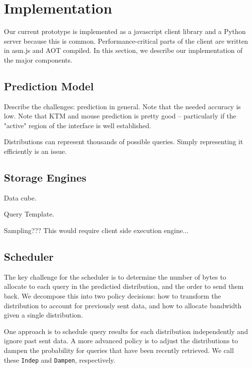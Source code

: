 \section{Implementation}

Our current prototype is implemented as a javascript client library and a Python server because this is common.  Performance-critical parts of the client are written in asm.js and AOT compiled.
In this section, we describe our implementation of the major components.


\subsection{Prediction Model}

Describe the challenges: prediction in general.  Note that the needed accuracy is low.  Note that KTM and mouse prediction is pretty good -- particularly if the "active" region of the interface is well established.



Distributions can represent thousands of possible queries.  Simply representing it efficiently is an issue.

\subsection{Storage Engines}

Data cube.

Query Template.

Sampling???  This would require client side execution engine...


\subsection{Scheduler}

The key challenge for the scheduler is to determine the number of bytes to allocate to each query in the predictied distribution, and the order to send them back.  We decompose this into two policy decisions: how to transform the distribution to account for previously sent data, and how to allocate bandwidth given a single distribution.

  One approach is to schedule query results for each distribution independently and ignore past sent data.  A more advanced policy is to adjust the distributions to dampen the probability for queries that have been recently retrieved.  We call these \texttt{Indep} and \texttt{Dampen}, respectively.

